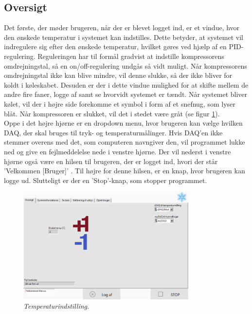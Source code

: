 \documentclass[../Hovedrapport.tex]{subfiles}
\begin{document}
\subsection*{Oversigt}
Det første, der møder brugeren, når der er blevet logget ind, er et vindue, hvor den ønskede temperatur i systemet kan indstilles. Dette betyder, at systemet vil indregulere sig efter den ønskede temperatur, hvilket gøres ved hjælp af en PID-regulering. Reguleringen har til formål gradvist at indstille kompressorens omdrejningstal, så en on/off-regulering undgås så vidt muligt. Når kompressorens omdrejningstal ikke kan blive mindre, vil denne slukke, så der ikke bliver for koldt i køleskabet. Desuden er der i dette vindue mulighed for at skifte mellem de andre fire faner, logge af samt se hvorvidt systemet er tændt. Når systemet bliver kølet, vil der i højre side forekomme et symbol i form af et snefnug, som lyser blåt. Når kompressoren er slukket, vil det i stedet være gråt (se figur \ref{fig:oversigt}).\\
Oppe i det højre hjørne er en dropdown menu, hvor brugeren kan vælge hvilken DAQ, der skal bruges til tryk- og temperaturmålinger. Hvis DAQ'en ikke stemmer overens med det, som computeren navngiver den, vil programmet lukke ned og give en fejlmeddelelse nede i venstre hjørne.
Der vil nederst i venstre hjørne også være en hilsen til brugeren, der er logget ind, hvori der står 'Velkommen [Bruger]' . Til højre for denne hilsen, er en knap, hvor brugeren kan logge ud. Slutteligt er der en 'Stop'-knap, som stopper programmet.
\begin{figure}[H]
	\centering
	\includegraphics[width=0.80\textwidth]{Billeder/oversigt.png}
	\caption{\textit{Temperaturindstilling}.}
	\label{fig:oversigt}
\end{figure}
\end{document}
